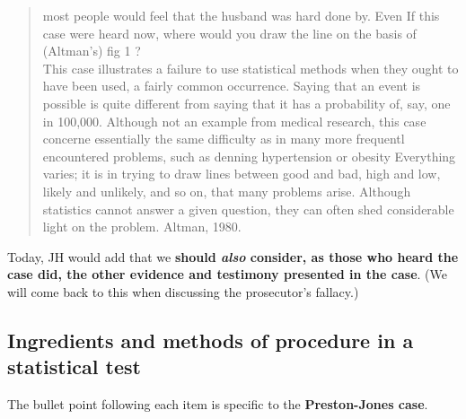 \documentclass[]{book}
\begin{document}
\begin{quote}
most people would feel that the husband was hard done by. Even If this case were heard now, where would you draw the line on the basis of (Altman's) fig 1 ?\\
This case illustrates a failure to use statistical methods when
they ought to have been used, a fairly common occurrence. Saying that an event is possible is quite different from saying that it has a probability of, say, one in 100,000. Although not an example from medical research, this case concerne essentially the same difficulty as in many more frequentl encountered problems, such as denning hypertension or obesity
Everything varies; it is in trying to draw lines between good and bad, high and low, likely and unlikely, and so on, that many problems arise. Although statistics cannot answer a given question, they can often shed considerable light on the problem. Altman, 1980.
\end{quote}

Today, JH would add that we \textbf{should \emph{also} consider, as those who heard the case did, the other evidence and testimony presented in the case}. (We will come back to this when discussing the prosecutor's fallacy.)

\hypertarget{ingredients-and-methods-of-procedure-in-a-statistical-test}{%
\subsection{Ingredients and methods of procedure in a statistical test}\label{ingredients-and-methods-of-procedure-in-a-statistical-test}}

The bullet point following each item is specific to the \textbf{Preston-Jones case}.
\end{document}
